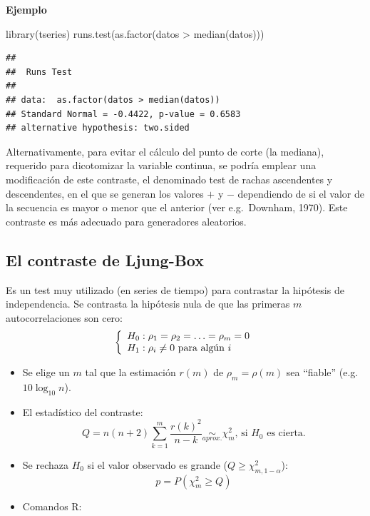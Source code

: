 \documentclass[
]{book}
\newenvironment{Shaded}{\begin{snugshade}}{\end{snugshade}}
\newcommand{\FunctionTok}[1]{\textcolor[rgb]{0.00,0.00,0.00}{#1}}
\newcommand{\NormalTok}[1]{#1}
\newcommand{\SpecialCharTok}[1]{\textcolor[rgb]{0.00,0.00,0.00}{#1}}
\theoremstyle{break}
\theoremstyle{nonumberplain}
\begin{document}
\textbf{Ejemplo}

\begin{Shaded}
\begin{Highlighting}[]
\FunctionTok{library}\NormalTok{(tseries)}
\FunctionTok{runs.test}\NormalTok{(}\FunctionTok{as.factor}\NormalTok{(datos }\SpecialCharTok{\textgreater{}} \FunctionTok{median}\NormalTok{(datos)))}
\end{Highlighting}
\end{Shaded}

\begin{verbatim}
## 
##  Runs Test
## 
## data:  as.factor(datos > median(datos))
## Standard Normal = -0.4422, p-value = 0.6583
## alternative hypothesis: two.sided
\end{verbatim}

Alternativamente, para evitar el cálculo del punto de corte (la mediana), requerido para dicotomizar la variable continua, se podría emplear una modificación de este contraste, el denominado test de rachas ascendentes y descendentes, en el que se generan los valores \(+\) y \(-\) dependiendo de si el valor de la secuencia es mayor o menor que el anterior (ver e.g.~Downham, 1970). Este contraste es más adecuado para generadores aleatorios.

\hypertarget{el-contraste-de-ljung-box}{%
\subsection{El contraste de Ljung-Box}\label{el-contraste-de-ljung-box}}

Es un test muy utilizado (en series de tiempo) para contrastar la
hipótesis de independencia.
Se contrasta la hipótesis nula de que las primeras \(m\)
autocorrelaciones son cero:
\[\left\{\begin{array}[c]{l}
    H_{0}:\rho_{1}=\rho_{2}=\ldots=\rho_{m}=0\\
    H_{1}:\rho_{i}\neq0\text{ para algún } i
\end{array}
\right.\]

\begin{itemize}
\item
  Se elige un \(m\) tal que la estimación \(r(m)\) de
  \(\rho_{m}=\rho(m)\) sea ``fiable'' (e.g.~\(10\log_{10}n\)).
\item
  El estadístico del contraste:
  \[Q=n(n+2)\sum_{k=1}^{m}\frac{r(k)^{2}}{n-k}\underset{aprox.}{\sim}\chi
  _{m}^{2}\text{, si }H_{0}\text{ es cierta.}\]
\item
  Se rechaza \(H_{0}\) si el valor observado es grande (\(Q\geq \chi_{m,1-\alpha}^{2}\)):
  \[p=P\left(  {\chi_{m}^{2}}\geq Q\right)\]
\item
  Comandos R:
\end{itemize}
\end{document}
